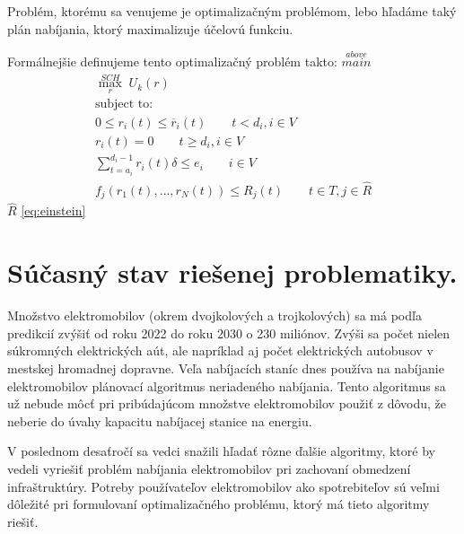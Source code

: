 Problém, ktorému sa venujeme je optimalizačným problémom, lebo hľadáme taký plán nabíjania, ktorý maximalizuje účelovú funkciu. 


Formálnejšie definujeme tento optimalizačný problém takto:
$\overset{above}{main}$
\begin{align}
    \label{eq:utility-function-general}
    \overset{SCH}{\underset{r}{\max}} \; U_{k}(r) \\
    \text{subject to:} \\
    0 ≤ r_{i}(t) ≤ \overline{r}_{i}(t)  \qquad t < d_{i}, i ∈ V \\
    r_{i}(t) = 0 \qquad t ≥ d_{i}, i ∈ V \\
    \sum_{t = a_{i}}^{d_{i} - 1} r_{i}(t) \delta ≤ e_{i} \qquad i ∈ V \\
    f_{j}(r_{1}(t), \dots, r_{N}(t) ) ≤ R_{j}(t) \qquad t ∈ T, j ∈ \hat{R}
\end{align}
$\hat{R}$
\ref{eq:einstein}























\section{Súčasný stav riešenej problematiky.}
Množstvo elektromobilov (okrem dvojkolových a trojkolových) sa má podľa predikcií \cite{iea2023} zvýšiť od roku 2022 do roku 2030 o 230 miliónov. Zvýši sa počet nielen súkromných elektrických aút, ale napríklad aj počet elektrických autobusov v mestskej hromadnej dopravne. \cite{iea2023} Veľa nabíjacích staníc dnes používa na nabíjanie elektromobilov plánovací algoritmus neriadeného nabíjania. Tento algoritmus sa už nebude môcť pri pribúdajúcom množstve elektromobilov použiť z dôvodu, že neberie do úvahy kapacitu nabíjacej stanice na energiu. \cite{lee2021acnsim} 

V poslednom desaťročí sa vedci snažili hľadať rôzne ďalšie algoritmy, ktoré by vedeli vyriešiť problém nabíjania elektromobilov pri zachovaní obmedzení infraštruktúry. \cite{iea2023} Potreby používateľov elektromobilov ako spotrebiteľov sú veľmi dôležité pri formulovaní optimalizačného problému, ktorý má tieto algoritmy riešiť.




